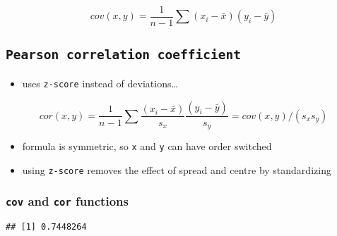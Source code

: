 \documentclass[
]{book}
\newenvironment{Shaded}{\begin{snugshade}}{\end{snugshade}}
\newcommand{\CommentTok}[1]{\textcolor[rgb]{0.56,0.35,0.01}{\textit{#1}}}
\newcommand{\FunctionTok}[1]{\textcolor[rgb]{0.00,0.00,0.00}{#1}}
\newcommand{\NormalTok}[1]{#1}
\newcommand{\SpecialCharTok}[1]{\textcolor[rgb]{0.00,0.00,0.00}{#1}}
\providecommand{\tightlist}{%
  \setlength{\itemsep}{0pt}\setlength{\parskip}{0pt}}
\theoremstyle{definition}
\theoremstyle{definition}
\theoremstyle{definition}
\theoremstyle{definition}
\theoremstyle{remark}
\begin{document}
\[
cov(x,y)=\frac{1}{n-1}\sum(x_i-\bar{x})(y_i-\bar{y})
\]

\hypertarget{pearson-correlation-coefficient}{%
\subsection{\texorpdfstring{\texttt{Pearson\ correlation\ coefficient}}{Pearson correlation coefficient}}\label{pearson-correlation-coefficient}}

\begin{itemize}
\tightlist
\item
  uses \texttt{z-score} instead of deviations\ldots{}
\end{itemize}

\[
cor(x,y)=\frac{1}{n-1}\sum\frac{(x_i-\bar{x})}{s_x}\frac{(y_i-\bar{y})}{s_y}=cov(x,y)/(s_xs_y)
\]

\begin{itemize}
\tightlist
\item
  formula is symmetric, so \texttt{x} and \texttt{y} can have order switched
\item
  using \texttt{z-score} removes the effect of spread and centre by standardizing
\end{itemize}

\hypertarget{cov-and-cor-functions}{%
\subsubsection{\texorpdfstring{\texttt{cov} and \texttt{cor} functions}{cov and cor functions}}\label{cov-and-cor-functions}}

\begin{Shaded}
\end{Shaded}

\begin{verbatim}
## [1] 0.7448264
\end{verbatim}

\begin{Shaded}
\end{Shaded}
\end{document}
